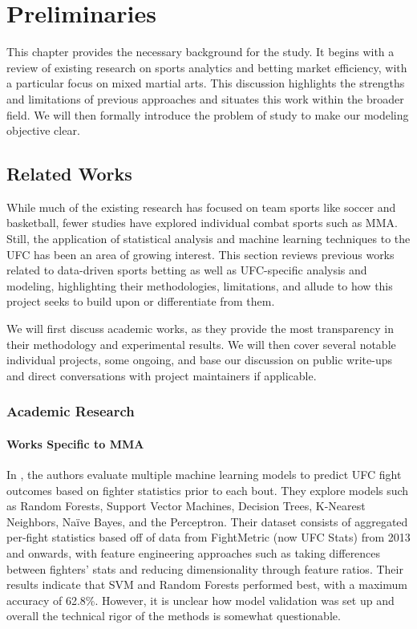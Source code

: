 \documentclass[12pt,twoside]{report}
\begin{document}
\chapter{Preliminaries}

This chapter provides the necessary background for the study. It begins with a review of existing research on sports analytics and betting market efficiency, with a particular focus on mixed martial arts. This discussion highlights the strengths and limitations of previous approaches and situates this work within the broader field. We will then formally introduce the problem of study to make our modeling objective clear.


\section{Related Works}

While much of the existing research has focused on team sports like soccer and basketball, fewer studies have explored individual combat sports such as MMA. Still, the application of statistical analysis and machine learning techniques to the UFC has been an area of growing interest. This section reviews previous works related to data-driven sports betting as well as UFC-specific analysis and modeling, highlighting their methodologies, limitations, and allude to how this project seeks to build upon or differentiate from them.

We will first discuss academic works, as they provide the most transparency in their methodology and experimental results. We will then cover several notable individual projects, some ongoing, and base our discussion on public write-ups and direct conversations with project maintainers if applicable.

\subsection{Academic Research}
\subsubsection{Works Specific to MMA}
In \citep{hitkul_2019}, the authors evaluate multiple machine learning models to predict UFC fight outcomes based on fighter statistics prior to each bout. They explore models such as Random Forests, Support Vector Machines, Decision Trees, K-Nearest Neighbors, Naïve Bayes, and the Perceptron. Their dataset consists of aggregated per-fight statistics based off of data from FightMetric (now UFC Stats) from 2013 and onwards, with feature engineering approaches such as taking differences between fighters' stats and reducing dimensionality through feature ratios. Their results indicate that SVM and Random Forests performed best, with a maximum accuracy of 62.8\%. However, it is unclear how model validation was set up and overall the technical rigor of the methods is somewhat questionable.
\end{document}
